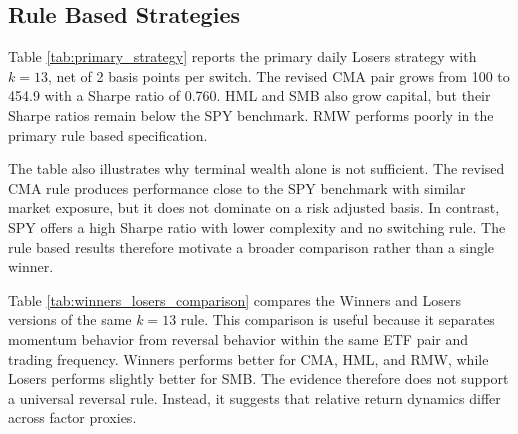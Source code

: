 \documentclass[investment,article,submit,pdftex,moreauthors]{Definitions/mdpi}
\begin{document}
\subsection{Rule Based Strategies}

Table \ref{tab:primary_strategy} reports the primary daily Losers strategy with \(k=13\), net of 2 basis points per switch. The revised CMA pair grows from 100 to 454.9 with a Sharpe ratio of 0.760. HML and SMB also grow capital, but their Sharpe ratios remain below the SPY benchmark. RMW performs poorly in the primary rule based specification.

\begin{table}[H]
\centering
\caption{Primary daily Losers strategy and SPY benchmark}
\label{tab:primary_strategy}
\scriptsize
{}
\end{table}

The table also illustrates why terminal wealth alone is not sufficient. The revised CMA rule produces performance close to the SPY benchmark with similar market exposure, but it does not dominate on a risk adjusted basis. In contrast, SPY offers a high Sharpe ratio with lower complexity and no switching rule. The rule based results therefore motivate a broader comparison rather than a single winner.

Table \ref{tab:winners_losers_comparison} compares the Winners and Losers versions of the same \(k=13\) rule. This comparison is useful because it separates momentum behavior from reversal behavior within the same ETF pair and trading frequency. Winners performs better for CMA, HML, and RMW, while Losers performs slightly better for SMB. The evidence therefore does not support a universal reversal rule. Instead, it suggests that relative return dynamics differ across factor proxies.
\end{document}

